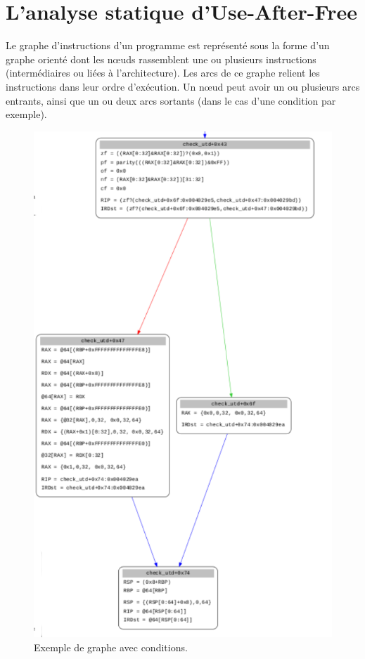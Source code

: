 \section{L'analyse statique d'Use-After-Free}
Le graphe d'instructions d'un programme est représenté sous la forme d'un graphe orienté dont les nœuds rassemblent une ou plusieurs
instructions (intermédiaires ou liées à l'architecture). Les arcs de ce graphe relient les instructions dans leur ordre d'exécution.
Un nœud peut avoir un ou plusieurs arcs entrants, ainsi que un ou deux arcs sortants (dans le cas d'une condition par exemple).
\begin{figure}[h]
    \centering
    \includegraphics[scale=0.3]{images/condition.png}\newline
    \caption{Exemple de graphe avec conditions.}
    \label{fig:graph-cond}
\end{figure}
